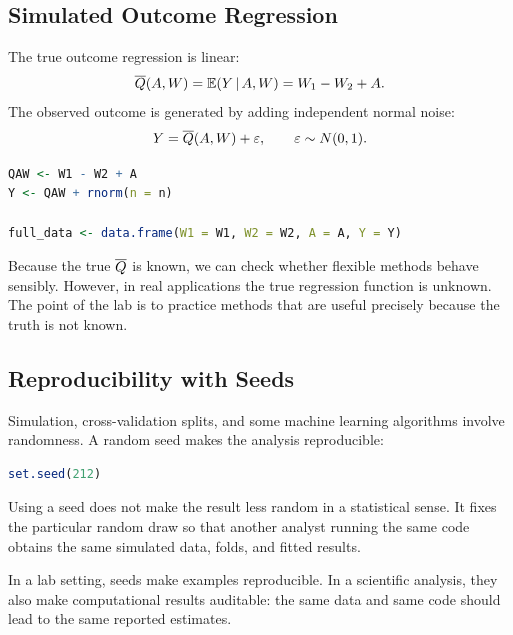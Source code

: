 \subsection{Simulated Outcome Regression}

The true outcome regression is linear:
\[
\overline{Q}(A,W)=\mathbb{E}(Y\,\vert\, A,W)=W_1-W_2+A.
\]
The observed outcome is generated by adding independent normal noise:
\[
Y=\overline{Q}(A,W)+\varepsilon,\qquad \varepsilon\sim N(0,1).
\]

\begin{implementationbox}
\begin{lstlisting}[language=R]
QAW <- W1 - W2 + A
Y <- QAW + rnorm(n = n)

full_data <- data.frame(W1 = W1, W2 = W2, A = A, Y = Y)
\end{lstlisting}
\end{implementationbox}

Because the true $\overline{Q}$ is known, we can check whether flexible methods behave
sensibly. However, in real applications the true regression function is unknown. The
point of the lab is to practice methods that are useful precisely because the truth is
not known.

\subsection{Reproducibility with Seeds}

Simulation, cross-validation splits, and some machine learning algorithms involve
randomness. A random seed makes the analysis reproducible:

\begin{implementationbox}
\begin{lstlisting}[language=R]
set.seed(212)
\end{lstlisting}
\end{implementationbox}

Using a seed does not make the result less random in a statistical sense. It fixes the
particular random draw so that another analyst running the same code obtains the
same simulated data, folds, and fitted results.

\begin{keyidea}
In a lab setting, seeds make examples reproducible. In a scientific analysis, they also
make computational results auditable: the same data and same code should lead to the
same reported estimates.
\end{keyidea}
